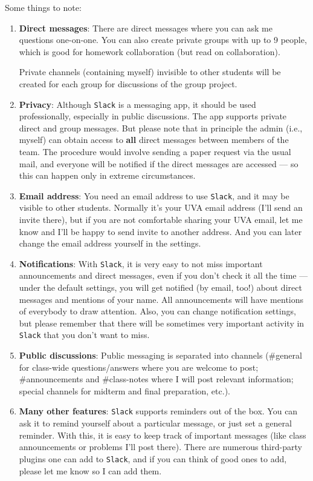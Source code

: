 \documentclass[oneside,11pt]{amsart}
\begin{document}
Some things to note: 
\begin{enumerate}[$\bullet$] 
	\item \textbf{Direct messages}:
		There are direct messages where you can ask me questions
		one-on-one. You can also create private groups with up to 9 people, which
		is good for homework collaboration (but read  on
		collaboration).

		\noindent Private channels (containing myself) invisible to other students
		will be created for each group for discussions of the group project.

	\item \textbf{Privacy}:
		Although \texttt{Slack} is a messaging app, it should be used
		professionally, especially in public discussions. The app supports private
		direct and group messages. But please note that in principle the admin
		(i.e., myself) can obtain access to \textbf{all} direct messages between
		members of the team. The procedure would involve sending a paper request
		via the usual mail, and everyone will be notified if the direct messages
		are accessed --- so this can happen only in extreme circumstances.
	\item \textbf{Email address}:
		You need an email address to use
		\texttt{Slack}, and it may be visible to other students. 
		Normally it's your UVA email address (I'll send an invite
		there), but if you are not comfortable sharing your UVA email, let me know
		and I'll be happy to send invite to another address.
		And you can later change the email address yourself in the
		settings.
	\item \textbf{Notifications}:
		With \texttt{Slack}, it is very easy to not miss important announcements and direct messages, even if 
		you don't check it all the time --- under the default settings, you will get notified (by email, too!)
		about direct messages and mentions of your name. All announcements will have mentions of everybody
		to draw attention. Also, you can change notification settings, but please remember that
		there will be sometimes very important activity in \texttt{Slack} that you don't want to miss.
	\item \textbf{Public discussions}:
		Public messaging is separated into channels
		(\#general for class-wide questions/answers where you are welcome to post; 
		\#announcements and \#class-notes where I will post relevant information;
		special channels for midterm and final preparation, etc.).  
	\item \textbf{Many other features}: 
		\texttt{Slack} supports reminders out of the box. 
		You can ask it to remind yourself about a particular message, or 
		just set a general reminder. 
		With this, it is 
		easy to keep track of important messages
		(like class announcements or problems I'll post there).
		There are numerous third-party plugins one can add to \texttt{Slack}, and if you can 
		think of good ones to add, please let me know so I can add them.

\end{enumerate}
\end{document}
